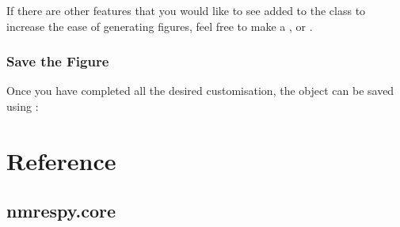 \documentclass[letterpaper,10pt,english]{sphinxmanual}
\begin{document}
\sphinxAtStartPar
If there are other features that you would like to see added to the
{\hyperref[\detokenize{references/plot:nmrespy.plot.NmrespyPlot}]{}} class to increase the ease
of generating figures, feel free to make a
,
or .


\subsection{Save the Figure}
\label{\detokenize{misc/figure_customisation:save-the-figure}}
\sphinxAtStartPar
Once you have completed all the desired customisation, the  object can be
saved using :

\begin{sphinxVerbatim}[commandchars=\\\{\}]
 
\end{sphinxVerbatim}




\chapter{Reference}
\label{\detokenize{references/index:reference}}\label{\detokenize{references/index::doc}}



\section{nmrespy.core}
\label{\detokenize{references/core:module-nmrespy.core}}\label{\detokenize{references/core:nmrespy-core}}\label{\detokenize{references/core::doc}}
\end{document}
